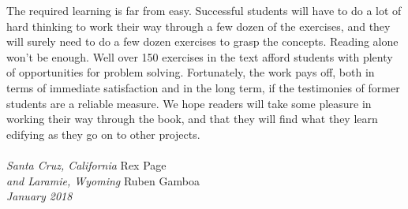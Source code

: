 The required learning is far from easy.
Successful students will have to do a lot of hard thinking
to work their way through a few dozen of the exercises,
and they will surely need to do a few dozen exercises to grasp the concepts.
Reading alone won't be enough.
Well over 150 exercises in the text afford students with plenty of opportunities
for problem solving.
Fortunately, the work pays off, both in terms of immediate satisfaction
and in the long term, if the testimonies of former students are a
reliable measure.
We hope readers will take some pleasure in working their way through
the book, and that they will find what they learn
edifying as they go on to other projects.
\\
\\
\emph{Santa Cruz, California}   \hfill Rex Page \\
\emph{and Laramie, Wyoming}         \hfill Ruben Gamboa \\
\emph{January 2018}


